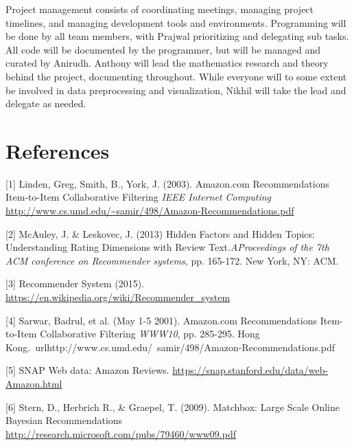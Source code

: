 \documentclass{article} %
\begin{document}
Project management consists of coordinating meetings, managing project timelines, and managing development tools and environments. Programming will be done by all team members, with Prajwal prioritizing and delegating sub tasks. All code will be documented by the programmer, but will be managed and curated by Anirudh. Anthony will lead the mathematics research and theory behind the project, documenting throughout. While everyone will to some extent be involved in data preprocessing and visualization, Nikhil will take the lead and delegate as needed. 

\section*{References}

\small{
[1] Linden, Greg, Smith, B., York, J. (2003). Amazon.com
Recommendations Item-to-Item Collaborative Filtering {\it IEEE Internet Computing} \url{http://www.cs.umd.edu/~samir/498/Amazon-Recommendations.pdf}

[2] McAuley, J. \& Leskovec, J. (2013) Hidden Factors and Hidden Topics: Understanding Rating Dimensions with Review Text.{\it AProceedings of the 7th ACM conference on Recommender systems}, pp. 165-172. New York, NY: ACM.

[3] Recommender System (2015). \url{https://en.wikipedia.org/wiki/Recommender_system}

[4] Sarwar, Badrul, et al. (May 1-5 2001). Amazon.com
Recommendations Item-to-Item Collaborative Filtering {\it WWW10}, pp. 285-295. Hong Kong.\ url{http://www.cs.umd.edu/~samir/498/Amazon-Recommendations.pdf}

[5] SNAP Web data: Amazon Reviews. \url{https://snap.stanford.edu/data/web-Amazon.html}

[6] Stern, D., Herbrich R., \& Graepel, T. (2009). Matchbox: Large Scale Online Bayesian Recommendations \url{http://research.microsoft.com/pubs/79460/www09.pdf}
}
\end{document}
